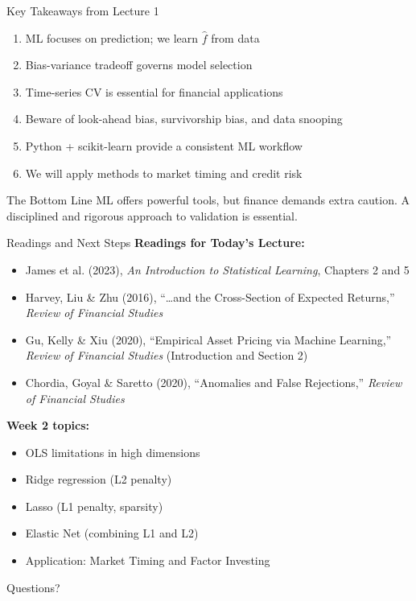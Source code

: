 \documentclass[10pt]{beamer}
\begin{document}
\begin{frame}{Key Takeaways from Lecture 1}
  \begin{enumerate}
    \item ML focuses on prediction; we learn $\widehat{f}$ from data
    \item Bias-variance tradeoff governs model selection
    \item Time-series CV is essential for financial applications
    \item Beware of look-ahead bias, survivorship bias, and data snooping
    \item Python + scikit-learn provide a consistent ML workflow
    \item We will apply methods to market timing and credit risk
  \end{enumerate}

  \vspace{1em}
  \begin{block}{The Bottom Line}
    ML offers powerful tools, but finance demands extra caution. A disciplined and rigorous approach to validation is essential.
  \end{block}
\end{frame}

\begin{frame}{Readings and Next Steps}
  \textbf{Readings for Today's Lecture:}
  \begin{itemize}
    \item James et al. (2023), \textit{An Introduction to Statistical Learning}, Chapters 2 and 5
    \item Harvey, Liu \& Zhu (2016), ``\ldots and the Cross-Section of Expected Returns,'' \textit{Review of Financial Studies}
    \item Gu, Kelly \& Xiu (2020), ``Empirical Asset Pricing via Machine Learning,'' \textit{Review of Financial Studies} (Introduction and Section 2)
    \item Chordia, Goyal \& Saretto (2020), ``Anomalies and False Rejections,'' \textit{Review of Financial Studies}
  \end{itemize}
  \vspace{1em}

  \textbf{Week 2 topics:}
  \begin{itemize}
    \item OLS limitations in high dimensions
    \item Ridge regression (L2 penalty)
    \item Lasso (L1 penalty, sparsity)
    \item Elastic Net (combining L1 and L2)
    \item Application: Market Timing and Factor Investing
  \end{itemize}
  
  

\end{frame}


\begin{frame}[plain]
  \centering
  \vfill
  {\Large Questions?}
  \vfill
\end{frame}
\end{document}
